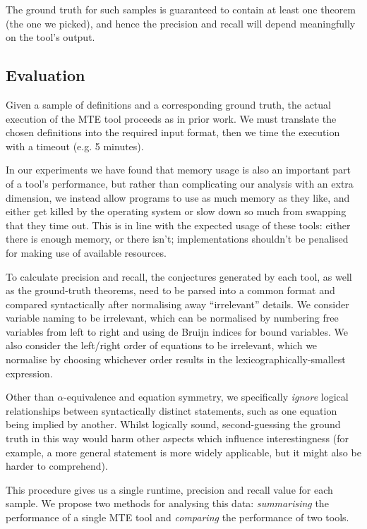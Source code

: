 The ground truth for such samples is guaranteed to contain at least one theorem
(the one we picked), and hence the precision and recall will depend meaningfully
on the tool's output.

\subsection{Evaluation}

Given a sample of definitions and a corresponding ground truth, the actual
execution of the MTE tool proceeds as in prior work. We must translate the
chosen definitions into the required input format, then we time the execution
with a timeout (e.g. 5 minutes).

In our experiments we have found that memory usage is also an important part of
a tool's performance, but rather than complicating our analysis with an extra
dimension, we instead allow programs to use as much memory as they like, and
either get killed by the operating system or slow down so much from swapping
that they time out. This is in line with the expected usage of these tools:
either there is enough memory, or there isn't; implementations shouldn't be
penalised for making use of available resources.

To calculate precision and recall, the conjectures generated by each tool, as
well as the ground-truth theorems, need to be parsed into a common format and
compared syntactically after normalising away ``irrelevant'' details. We
consider variable naming to be irrelevant, which can be normalised by numbering
free variables from left to right and using de Bruijn indices for bound
variables. We also consider the left/right order of equations to be irrelevant,
which we normalise by choosing whichever order results in the
lexicographically-smallest expression.

Other than $\alpha$-equivalence and equation symmetry, we specifically
\emph{ignore} logical relationships between syntactically distinct statements,
such as one equation being implied by another. Whilst logically sound,
second-guessing the ground truth in this way would harm other aspects which
influence interestingness (for example, a more general statement is more widely
applicable, but it might also be harder to comprehend).

This procedure gives us a single runtime, precision and recall value for each
sample. We propose two methods for analysing this data: \emph{summarising}
the performance of a single MTE tool and \emph{comparing} the performance of two
tools.


